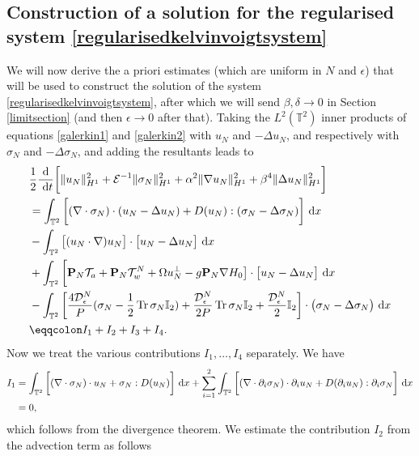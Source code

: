 \documentclass[12pt,a4paper]{article}
\theoremstyle{definition}
\theoremstyle{remark}
\numberwithin{equation}{section}
\newcommand{\dx}{\ {\rm d} {x}}
\newcommand{\dt}{\ {\rm d} t }
\DeclareMathOperator{\Tr}{Tr}
\begin{document}
\subsection{Construction of a solution for the regularised system \eqref{regularisedkelvinvoigtsystem}} \label{regularisedsystemsection}
We will now derive the a priori estimates (which are uniform in $N$ and $\epsilon$) that will be used to construct the solution of the system \eqref{regularisedkelvinvoigtsystem}, after which we will send $\beta, \delta \rightarrow 0$ in Section \ref{limitsection} (and then $\epsilon \rightarrow 0$ after that). Taking the $L^2 (\mathbb{T}^2)$ inner products of equations \eqref{galerkin1} and \eqref{galerkin2} with $u_N$ and $-\Delta u_N$, and respectively with $\sigma_N$ and $-\Delta \sigma_N$, and adding the resultants leads to
\begin{align*}
&\frac{1}{2} \frac{\textrm{d}}{\dt} \bigg[ \lVert u_N \rVert_{H^1}^2 + \mathcal{E}^{-1} \lVert \sigma_N \rVert_{H^1}^2 + \alpha^2 \lVert \nabla u_N \rVert_{H^1}^2 + \beta^4 \lVert \Delta u_N \rVert_{H^1}^2 \bigg] \\
&= \int_{\mathbb{T}^2} \bigg[ (\nabla \cdot \sigma_N) \cdot (u_N - \Delta u_N) + D(u_N) : (\sigma_N - \Delta \sigma_N) \bigg] \dx \\
&- \int_{\mathbb{T}^2} \big[(u_N \cdot \nabla) u_N \big] \cdot \big[u_N - \Delta u_N \big] \dx \\
&+ \int_{\mathbb{T}^2} \bigg[ \mathbf{P}_N \mathcal{T}_a + \mathbf{P}_N \mathcal{T}_w^N + \Omega u^\perp_N - g \mathbf{P}_N \nabla H_0 \big] \cdot \big[u_N - \Delta u_N \big] \dx \\
&- \int_{\mathbb{T}^2} \bigg[ \frac{4 \mathcal{D}_\epsilon^N}{P} (\sigma_N - \frac{1}{2} \Tr \sigma_N \mathbb I_2) + \frac{\mathcal{D}_\epsilon^N}{2 P} \Tr \sigma_N \mathbb I_2 + \frac{\mathcal{D}_\epsilon^N}{2} \mathbb I_2 \bigg] \cdot \big(\sigma_N - \Delta \sigma_N \big) \dx \\
&\eqqcolon I_1 + I_2 + I_3 + I_4.
\end{align*}
Now we treat the various contributions $I_1, \ldots, I_4$ separately. We have
\begin{align*}
I_1 &= \int_{\mathbb{T}^2} \bigg[(\nabla \cdot \sigma_N) \cdot u_N + \sigma_N : D(u_N) \bigg] \dx + \sum_{i=1}^2 \int_{\mathbb{T}^2} \bigg[ (\nabla \cdot \partial_i \sigma_N) \cdot \partial_i u_N + D(\partial_i u_N) : \partial_i \sigma_N \bigg] \dx \\
&= 0,
\end{align*}
which follows from the divergence theorem. We estimate the contribution $I_2$ from the advection term as follows
\end{document}
